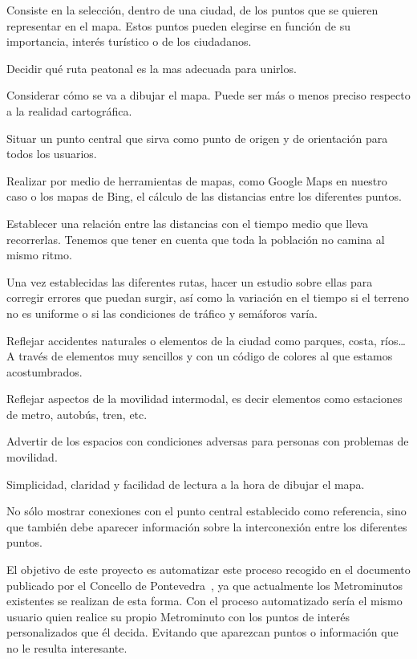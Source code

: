 \begin{steps}
	\item Consiste en la selección, dentro de una ciudad, de los puntos que se quieren representar en el mapa. Estos puntos pueden elegirse en función de su importancia, interés turístico o de los ciudadanos.
	\item Decidir qué ruta peatonal es la mas adecuada para unirlos.
	\item Considerar cómo se va a dibujar el mapa. Puede ser más o menos preciso respecto a la realidad cartográfica.
	\item Situar un punto central que sirva como punto de origen y de orientación para todos los usuarios.
	\item Realizar por medio de herramientas de mapas, como Google Maps en nuestro caso o los mapas de Bing, el cálculo de las distancias entre los diferentes puntos.
	\item Establecer una relación entre las distancias con el tiempo medio que lleva recorrerlas. Tenemos que tener en cuenta que toda la población no camina al mismo ritmo.
	\item Una vez establecidas las diferentes rutas, hacer un estudio sobre ellas para corregir errores que puedan surgir, así como la variación en el tiempo si el terreno no es uniforme o si las condiciones de tráfico y semáforos varía.
	\item Reflejar accidentes naturales o elementos de la ciudad como parques, costa, ríos\dots A través de elementos muy sencillos y con un código de colores al que estamos acostumbrados.
	\item Reflejar aspectos de la movilidad intermodal, es decir elementos como estaciones de metro, autobús, tren, etc. 
	\item Advertir de los espacios con condiciones adversas para personas con problemas de movilidad.
	\item Simplicidad, claridad y facilidad de lectura a la hora de dibujar el mapa.
	\item No sólo mostrar conexiones con el punto central establecido como referencia, sino que también debe aparecer información sobre la interconexión entre los diferentes puntos.
\end{steps}

El objetivo de este proyecto es automatizar este proceso recogido en el documento publicado por el Concello de Pontevedra~\cite{metrominuto}, ya que actualmente los Metrominutos existentes se realizan de esta forma. Con el proceso automatizado sería el mismo usuario quien realice su propio Metrominuto con los puntos de interés personalizados que él decida. Evitando que aparezcan puntos o información que no le resulta interesante.



